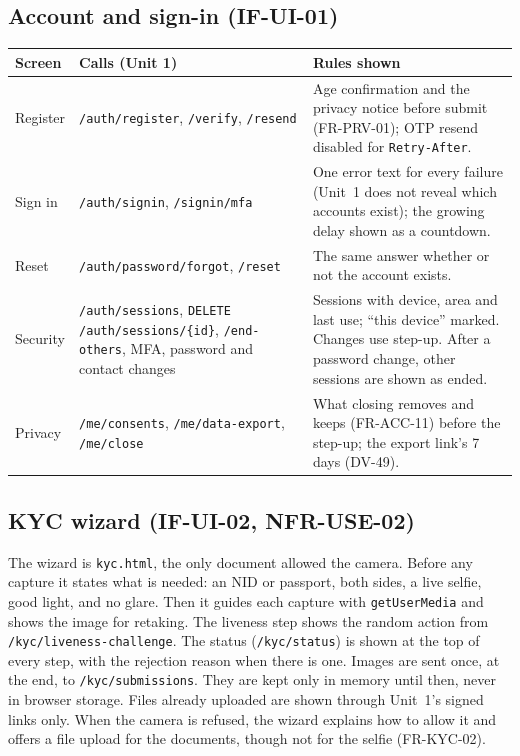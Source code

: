 \documentclass[11pt,a4paper]{article}
\newenvironment{dtable}[1]{\small\begin{longtable}{#1}}{\end{longtable}}
\begin{document}
\subsection{Account and sign-in (IF-UI-01)}
\begin{dtable}{@{}>{\raggedright\arraybackslash}p{3.0cm}>{\raggedright\arraybackslash}p{5.4cm}>{\raggedright\arraybackslash}p{6.8cm}@{}}
\toprule
\textbf{Screen} & \textbf{Calls (Unit 1)} & \textbf{Rules shown} \\ \midrule \endhead
Register & \texttt{/auth/register}, \texttt{/verify}, \texttt{/resend} & Age confirmation and the privacy notice before submit (FR-PRV-01); OTP resend disabled for \texttt{Retry-After}. \\
Sign in & \texttt{/auth/signin}, \texttt{/signin/mfa} & One error text for every failure (Unit~1 does not reveal which accounts exist); the growing delay shown as a countdown. \\
Reset & \texttt{/auth/password/forgot}, \texttt{/reset} & The same answer whether or not the account exists. \\
Security & \texttt{/auth/sessions}, \texttt{DELETE /auth/sessions/\{id\}}, \texttt{/end-others}, MFA, password and contact changes & Sessions with device, area and last use; ``this device'' marked. Changes use step-up. After a password change, other sessions are shown as ended. \\
Privacy & \texttt{/me/consents}, \texttt{/me/data-export}, \texttt{/me/close} & What closing removes and keeps (FR-ACC-11) before the step-up; the export link's 7 days (DV-49). \\
\bottomrule
\end{dtable}

\subsection{KYC wizard (IF-UI-02, NFR-USE-02)}
The wizard is \texttt{kyc.html}, the only document allowed the camera. Before any capture it states what is needed: an NID or passport, both sides, a live selfie, good light, and no glare. Then it guides each capture with \texttt{getUserMedia} and shows the image for retaking. The liveness step shows the random action from \texttt{/kyc/liveness-challenge}. The status (\texttt{/kyc/status}) is shown at the top of every step, with the rejection reason when there is one. Images are sent once, at the end, to \texttt{/kyc/submissions}. They are kept only in memory until then, never in browser storage. Files already uploaded are shown through Unit~1's signed links only. When the camera is refused, the wizard explains how to allow it and offers a file upload for the documents, though not for the selfie (FR-KYC-02).
\end{document}
